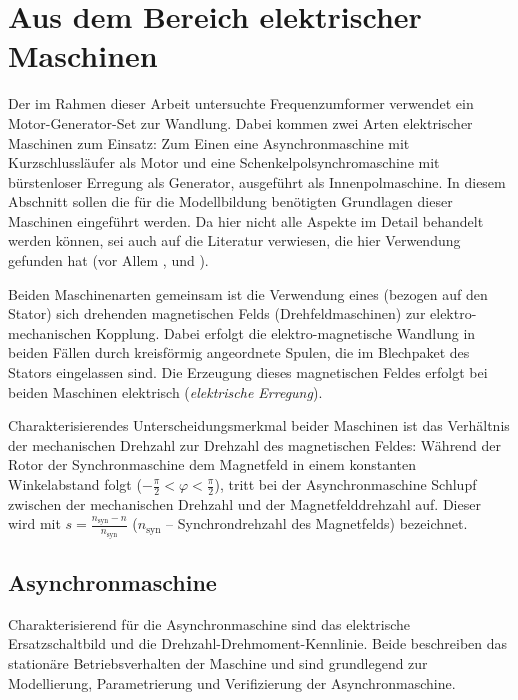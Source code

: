 \section{Aus dem Bereich elektrischer Maschinen}
\label{sec:GrundlagenEMaschinen}
Der im Rahmen dieser Arbeit untersuchte Frequenzumformer verwendet ein Motor-Generator-Set zur Wandlung. Dabei kommen zwei Arten elektrischer Maschinen zum Einsatz: Zum Einen eine Asynchronmaschine mit Kurzschlussläufer als Motor und eine Schenkelpolsynchromaschine mit bürstenloser Erregung als Generator, ausgeführt als Innenpolmaschine. In diesem Abschnitt sollen die für die Modellbildung benötigten Grundlagen dieser Maschinen eingeführt werden. Da hier nicht alle Aspekte im Detail behandelt werden können, sei auch auf die Literatur verwiesen, die hier Verwendung gefunden hat (vor Allem \cite{binderElektrischeMaschinenUnd2012}, \cite{beckElektrischeEnergietechnikEinfuhrung2008} und \cite{mullerGrundlagenElektrischerMaschinen2005}).

Beiden Maschinenarten gemeinsam ist die Verwendung eines (bezogen auf den Stator) sich drehenden magnetischen Felds (Drehfeldmaschinen) zur elektro-mechanischen Kopplung. Dabei erfolgt die elektro-magnetische Wandlung in beiden Fällen durch kreisförmig angeordnete Spulen, die im Blechpaket des Stators eingelassen sind. Die Erzeugung dieses magnetischen Feldes erfolgt bei beiden Maschinen elektrisch (\emph{elektrische Erregung}).

Charakterisierendes Unterscheidungsmerkmal beider Maschinen ist das Verhältnis der mechanischen Drehzahl zur Drehzahl des magnetischen Feldes: Während der Rotor der Synchronmaschine dem Magnetfeld in einem konstanten Winkelabstand folgt (\(-\frac{\pi}{2} < \varphi < \frac{\pi}{2}\)), tritt bei der Asynchronmaschine Schlupf zwischen der mechanischen Drehzahl und der Magnetfelddrehzahl auf. Dieser wird mit \(s=\frac{n_{\mathrm{syn}} - n}{n_{\mathrm{syn}}}\) (\(n_{\mathrm{syn}}\) -- Synchrondrehzahl des Magnetfelds) bezeichnet.

\subsection{Asynchronmaschine}
Charakterisierend für die Asynchronmaschine sind das elektrische Ersatzschaltbild und die Drehzahl-Drehmoment-Kennlinie. Beide beschreiben das stationäre Betriebsverhalten der Maschine und sind grundlegend zur Modellierung, Parametrierung und Verifizierung der Asynchronmaschine.
